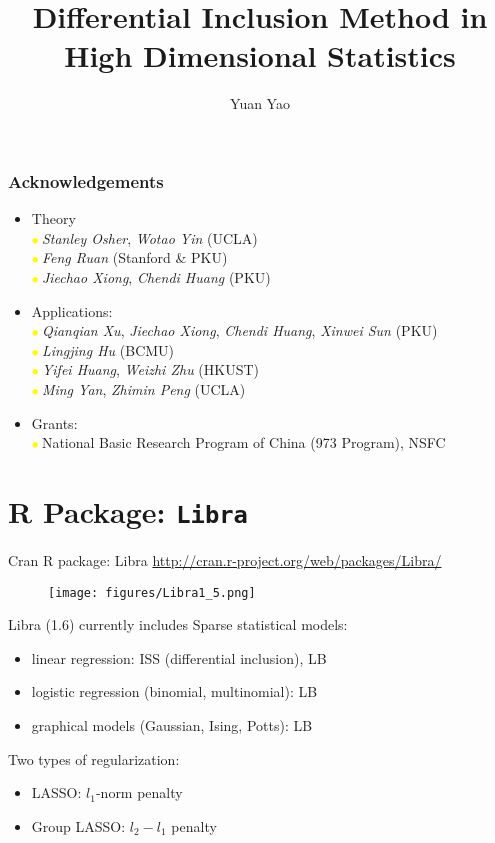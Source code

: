 \documentclass[slidestop,compress,9pt,epsfig,color]{beamer}
\title[Differential Inclusion Method in High Dimensional Statistics]{Differential Inclusion Method in High Dimensional Statistics}
\author{Yuan Yao}
\institute{HKUST} %
\theoremstyle{example}
\providecommand{\subitem}{\\ \textcolor{yellow}{$\bullet\ $}}
\begin{document}
\frame{\titlepage}

\begin{frame}
\frametitle{Acknowledgements}
\begin{itemize}
\item Theory
\subitem \emph{Stanley Osher}, \emph{Wotao Yin} (UCLA)
\subitem \emph{Feng Ruan} (Stanford \& PKU)
\subitem \emph{Jiechao Xiong}, \emph{Chendi Huang} (PKU)
\item Applications: 
\subitem \emph{Qianqian Xu}, \emph{Jiechao Xiong}, \emph{Chendi Huang}, \emph{Xinwei Sun} (PKU)
\subitem \emph{Lingjing Hu} (BCMU)
\subitem \emph{Yifei Huang}, \emph{Weizhi Zhu} (HKUST)
\subitem \emph{Ming Yan}, \emph{Zhimin Peng} (UCLA)
\item Grants:
\subitem National Basic Research Program of China (973 Program), NSFC
\end{itemize}
\end{frame}


\section[Outline]{}
\frame{\tableofcontents}

\section[R Package: Libra]{R Package: \tt{Libra}}
\begin{frame}{Cran R package: Libra}
\url{http://cran.r-project.org/web/packages/Libra/}
\begin{figure}[!h]
\texttt{[image: figures/Libra1\_5.png]}  \\	%
\end{figure}
\end{frame}

\begin{frame}{Libra (1.6) currently includes}
Sparse statistical models:
\begin{itemize}
\item linear regression: ISS (differential inclusion), LB
\item logistic regression (binomial, multinomial): LB
\item graphical models (Gaussian, Ising, Potts): LB
\end{itemize}
Two types of regularization:
\begin{itemize}
\item LASSO: $l_1$-norm penalty
\item Group LASSO: $l_2-l_1$ penalty
\end{itemize}
\end{frame}
\end{document}
